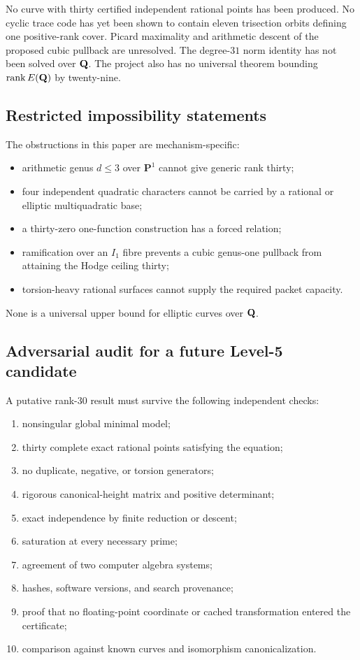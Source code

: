 No curve with thirty certified independent rational points has been produced.
No cyclic trace code has yet been shown to contain eleven trisection orbits
defining one positive-rank cover.  Picard maximality and arithmetic descent of
the proposed cubic pullback are unresolved.  The degree-$31$ norm identity has
not been solved over $\mathbf Q$.  The project also has no universal theorem bounding
$\operatorname{rank} E(\mathbf Q)$ by twenty-nine.

\subsection{Restricted impossibility statements}

The obstructions in this paper are mechanism-specific:
\begin{itemize}[leftmargin=*]
\item arithmetic genus $d\le3$ over $\mathbf P^1$ cannot give generic rank thirty;
\item four independent quadratic characters cannot be carried by a rational or elliptic multiquadratic base;
\item a thirty-zero one-function construction has a forced relation;
\item ramification over an $I_1$ fibre prevents a cubic genus-one pullback from attaining the Hodge ceiling thirty;
\item torsion-heavy rational surfaces cannot supply the required packet capacity.
\end{itemize}
None is a universal upper bound for elliptic curves over $\mathbf Q$.

\subsection{Adversarial audit for a future Level-5 candidate}

A putative rank-$30$ result must survive the following independent checks:
\begin{enumerate}[leftmargin=*]
\item nonsingular global minimal model;
\item thirty complete exact rational points satisfying the equation;
\item no duplicate, negative, or torsion generators;
\item rigorous canonical-height matrix and positive determinant;
\item exact independence by finite reduction or descent;
\item saturation at every necessary prime;
\item agreement of two computer algebra systems;
\item hashes, software versions, and search provenance;
\item proof that no floating-point coordinate or cached transformation entered the certificate;
\item comparison against known curves and isomorphism canonicalization.
\end{enumerate}

